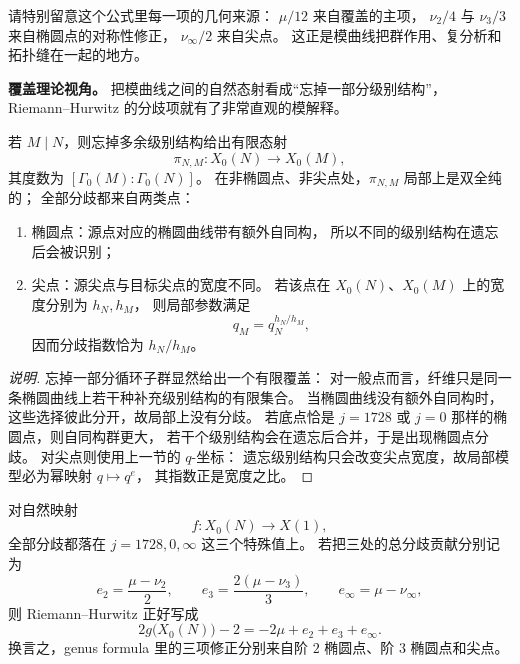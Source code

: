 \begin{remark}
请特别留意这个公式里每一项的几何来源：
$\mu/12$ 来自覆盖的主项，
$\nu_2/4$ 与 $\nu_3/3$ 来自椭圆点的对称性修正，
$\nu_\infty/2$ 来自尖点。
这正是模曲线把群作用、复分析和拓扑缝在一起的地方。
\end{remark}

\textbf{覆盖理论视角。}
把模曲线之间的自然态射看成“忘掉一部分级别结构”，
Riemann--Hurwitz 的分歧项就有了非常直观的模解释。

\begin{proposition}[遗忘级别结构的分歧]
\label{prop:forget-level-ramification}
若 $M\mid N$，则忘掉多余级别结构给出有限态射
\[
  \pi_{N,M}:X_0(N)\longrightarrow X_0(M),
\]
其度数为 $[\Gamma_0(M):\Gamma_0(N)]$。
在非椭圆点、非尖点处，$\pi_{N,M}$ 局部上是双全纯的；
全部分歧都来自两类点：
\begin{enumerate}
  \item 椭圆点：源点对应的椭圆曲线带有额外自同构，
        所以不同的级别结构在遗忘后会被识别；
  \item 尖点：源尖点与目标尖点的宽度不同。
        若该点在 $X_0(N)$、$X_0(M)$ 上的宽度分别为 $h_N,h_M$，
        则局部参数满足
        \[
          q_M=q_N^{h_N/h_M},
        \]
        因而分歧指数恰为 $h_N/h_M$。
\end{enumerate}
\end{proposition}

\begin{proof}[说明]
忘掉一部分循环子群显然给出一个有限覆盖：
对一般点而言，纤维只是同一条椭圆曲线上若干种补充级别结构的有限集合。
当椭圆曲线没有额外自同构时，这些选择彼此分开，故局部上没有分歧。
若底点恰是 $j=1728$ 或 $j=0$ 那样的椭圆点，则自同构群更大，
若干个级别结构会在遗忘后合并，于是出现椭圆点分歧。
对尖点则使用上一节的 $q$-坐标：
遗忘级别结构只会改变尖点宽度，故局部模型必为幂映射 $q\mapsto q^e$，
其指数正是宽度之比。
\end{proof}

\begin{corollary}[映到 $X(1)$ 时的三类分歧]
\label{cor:ramification-to-x1}
对自然映射
\[
  f:X_0(N)\longrightarrow X(1),
\]
全部分歧都落在 $j=1728,0,\infty$ 这三个特殊值上。
若把三处的总分歧贡献分别记为
\[
  e_2=\frac{\mu-\nu_2}{2},
  \qquad
  e_3=\frac{2(\mu-\nu_3)}{3},
  \qquad
  e_\infty=\mu-\nu_\infty,
\]
则 Riemann--Hurwitz 正好写成
\[
  2g\bigl(X_0(N)\bigr)-2=-2\mu+e_2+e_3+e_\infty.
\]
换言之，genus formula 里的三项修正分别来自阶 $2$ 椭圆点、阶 $3$ 椭圆点和尖点。
\end{corollary}


